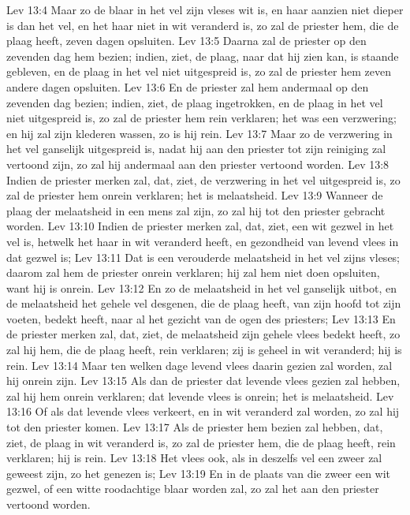 Lev 13:4  Maar zo de blaar in het vel zijn vleses wit is, en haar aanzien niet dieper is dan het vel, en het haar niet in wit veranderd is, zo zal de priester hem, die de plaag heeft, zeven dagen opsluiten.
Lev 13:5  Daarna zal de priester op den zevenden dag hem bezien; indien, ziet, de plaag, naar dat hij zien kan, is staande gebleven, en de plaag in het vel niet uitgespreid is, zo zal de priester hem zeven andere dagen opsluiten.
Lev 13:6  En de priester zal hem andermaal op den zevenden dag bezien; indien, ziet, de plaag ingetrokken, en de plaag in het vel niet uitgespreid is, zo zal de priester hem rein verklaren; het was een verzwering; en hij zal zijn klederen wassen, zo is hij rein.
Lev 13:7  Maar zo de verzwering in het vel ganselijk uitgespreid is, nadat hij aan den priester tot zijn reiniging zal vertoond zijn, zo zal hij andermaal aan den priester vertoond worden.
Lev 13:8  Indien de priester merken zal, dat, ziet, de verzwering in het vel uitgespreid is, zo zal de priester hem onrein verklaren; het is melaatsheid.
Lev 13:9  Wanneer de plaag der melaatsheid in een mens zal zijn, zo zal hij tot den priester gebracht worden.
Lev 13:10  Indien de priester merken zal, dat, ziet, een wit gezwel in het vel is, hetwelk het haar in wit veranderd heeft, en gezondheid van levend vlees in dat gezwel is;
Lev 13:11  Dat is een verouderde melaatsheid in het vel zijns vleses; daarom zal hem de priester onrein verklaren; hij zal hem niet doen opsluiten, want hij is onrein.
Lev 13:12  En zo de melaatsheid in het vel ganselijk uitbot, en de melaatsheid het gehele vel desgenen, die de plaag heeft, van zijn hoofd tot zijn voeten, bedekt heeft, naar al het gezicht van de ogen des priesters;
Lev 13:13  En de priester merken zal, dat, ziet, de melaatsheid zijn gehele vlees bedekt heeft, zo zal hij hem, die de plaag heeft, rein verklaren; zij is geheel in wit veranderd; hij is rein.
Lev 13:14  Maar ten welken dage levend vlees daarin gezien zal worden, zal hij onrein zijn.
Lev 13:15  Als dan de priester dat levende vlees gezien zal hebben, zal hij hem onrein verklaren; dat levende vlees is onrein; het is melaatsheid.
Lev 13:16  Of als dat levende vlees verkeert, en in wit veranderd zal worden, zo zal hij tot den priester komen.
Lev 13:17  Als de priester hem bezien zal hebben, dat, ziet, de plaag in wit veranderd is, zo zal de priester hem, die de plaag heeft, rein verklaren; hij is rein.
Lev 13:18  Het vlees ook, als in deszelfs vel een zweer zal geweest zijn, zo het genezen is;
Lev 13:19  En in de plaats van die zweer een wit gezwel, of een witte roodachtige blaar worden zal, zo zal het aan den priester vertoond worden.
